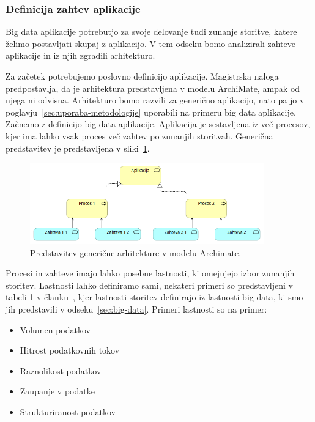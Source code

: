 \subsubsection{Definicija zahtev aplikacije}

Big data aplikacije potrebutjo za svoje delovanje
tudi zunanje storitve, katere želimo postavljati skupaj z
aplikacijo.
V tem odseku bomo analizirali zahteve aplikacije in
iz njih zgradili arhitekturo.

Za začetek potrebujemo poslovno definicijo aplikacije.
Magistrska naloga predpostavlja, da je arhitektura
predstavljena v modelu ArchiMate, ampak od njega ni odvisna.
Arhitekturo bomo razvili za generično aplikacijo,
nato pa jo v poglavju~\ref{sec:uporaba-metodologije} uporabili
na primeru big data aplikacije.
Začnemo z definicijo big data aplikacije.
Aplikacija je sestavljena iz več procesov, kjer ima lahko
vsak proces več zahtev po zunanjih storitvah.
Generična predstavitev je predstavljena v sliki~\ref{fig:generic-arch-application}.

\begin{figure}[H]
    \centering
    \includegraphics[width=0.9\textwidth]{img/gradnja/generic-arch-application.png}
    \caption{Predstavitev generične arhitekture v modelu Archimate.}
    \label{fig:generic-arch-application}
\end{figure}

Procesi in zahteve imajo lahko posebne lastnosti,
ki omejujejo izbor zunanjih storitev.
Lastnosti lahko definiramo sami, nekateri primeri so predstavljeni v tabeli 1 v članku~\cite{iterative_methodology},
kjer lastnosti storitev definirajo iz lastnosti big data,
ki smo jih predstavili v odseku~\ref{sec:big-data}.
Primeri lastnosti so na primer:
\begin{itemize}
    \item Volumen podatkov
    \item Hitrost podatkovnih tokov
    \item Raznolikost podatkov
    \item Zaupanje v podatke
    \item Strukturiranost podatkov
\end{itemize}

